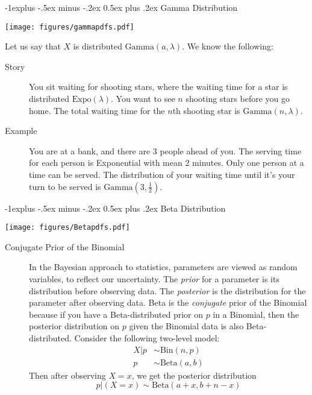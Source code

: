 \documentclass[10pt,landscape]{article}
\makeatletter
\newcommand{\Bin}{\textrm{Bin}}
\newcommand{\Beta}{\textrm{Beta}}
\newcommand{\Gam}{\textrm{Gamma}}
\newcommand{\Expo}{\textrm{Expo}}
\renewcommand{\subsection}{\@startsection{subsection}{2}{0mm}%
                                {-1explus -.5ex minus -.2ex}%
                                {0.5ex plus .2ex}%
                                {\normalfont\normalsize\bfseries}}
\makeatother
\begin{document}
\begin{multicols*}{3}
\subsection{Gamma Distribution}
\begin{minipage}{\linewidth}
            \centering
\texttt{[image: figures/gammapdfs.pdf]}
        \end{minipage}
\medskip
Let us say that $X$ is distributed $\Gam(a, \lambda)$. We know the following:
\begin{description}
    \item[Story] You sit waiting for shooting stars, where the waiting time for a star is distributed $\Expo(\lambda)$. You want to see $n$ shooting stars before you go home. The total waiting time for the $n$th shooting star is $\Gam(n,\lambda)$.
    \item[Example]  You are at a bank, and there are 3 people ahead of you. The serving time for each person is Exponential with mean $2$ minutes. Only one person at a time can be served. The distribution of your waiting time until it's your turn to be served is $\Gam(3, \frac{1}{2})$.

\end{description}

\subsection{Beta Distribution}
\begin{minipage}{\linewidth}
            \centering
\texttt{[image: figures/Betapdfs.pdf]}
        \end{minipage}
\medskip

\begin{description}

\item[Conjugate Prior of the Binomial] In the Bayesian approach to statistics, parameters are viewed as random variables, to reflect our uncertainty. The \emph{prior} for a parameter is its distribution before observing data. The \emph{posterior}  is the distribution for the parameter after observing data. Beta is the \emph{conjugate} prior of the Binomial because if you have a Beta-distributed prior on $p$ in a Binomial, then the posterior distribution on $p$ given the Binomial data is also Beta-distributed. Consider the following two-level model:
    \begin{align*}
        X|p &\sim \Bin(n, p) \\
        p &\sim \Beta(a, b)
    \end{align*}
Then after observing  $X = x$, we get the posterior distribution
\[p|(X=x) \sim \Beta(a + x, b + n - x) \]


\end{description}
\end{multicols*}
\end{document}
